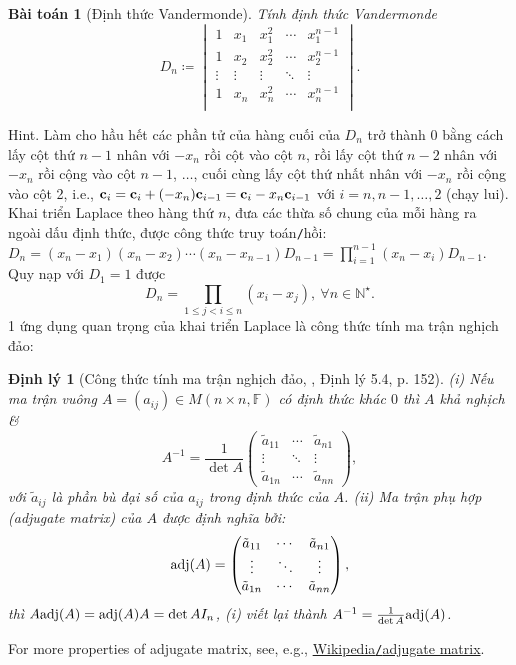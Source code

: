 \documentclass{article}
\newtheorem{baitoan}{Bài toán}
\newtheorem{dinhly}{Định lý}
\begin{document}
\begin{baitoan}[Định thức Vandermonde]
	Tính định thức Vandermonde
	\begin{equation*}
		D_n\coloneqq\begin{vmatrix}
			1 & x_1 & x_1^2 & \cdots & x_1^{n-1}\\
			1 & x_2 & x_2^2 & \cdots & x_2^{n-1}\\
			\vdots & \vdots & \vdots & \ddots & \vdots\\
			1 & x_n & x_n^2 & \cdots & x_n^{n-1}\\
		\end{vmatrix}.
	\end{equation*}
\end{baitoan}
{\sf Hint.} Làm cho hầu hết các phần tử của hàng cuối của $D_n$ trở thành 0 bằng cách lấy cột thứ $n - 1$ nhân với $-x_n$ rồi cột vào cột $n$, rồi lấy cột thứ $n - 2$ nhân với $-x_n$ rồi cộng vào cột $n - 1$, $\ldots$, cuối cùng lấy cột thứ nhất nhân với $-x_n$ rồi cộng vào cột 2, i.e., ${\bf c}_i = {\bf c}_i + (-x_n){\bf c}_{i-1} = {\bf c}_i - x_n{\bf c}_{i-1}$ với $i = n,n - 1,\ldots,2$ (chạy lui). Khai triển Laplace theo hàng thứ $n$, đưa các thừa số chung của mỗi hàng ra ngoài dấu định thức, được công thức truy toán{\tt/}hồi: $D_n = (x_n - x_1)(x_n - x_2)\cdots(x_n - x_{n-1})D_{n-1} = \prod_{i=1}^{n-1} (x_n - x_i)D_{n-1}$. Quy nạp với $D_1 = 1$ được
\begin{equation}
	\label{Vandermonde det}
	\tag{Vandermonde}
	D_n = \prod_{1\le j < i\le n} (x_i - x_j),\ \forall n\in\mathbb{N}^\star.
\end{equation}
1 ứng dụng quan trọng của khai triển Laplace là công thức tính ma trận nghịch đảo:

\begin{dinhly}[Công thức tính ma trận nghịch đảo, \cite{Hung_linear_algebra}, Định lý 5.4, p. 152]
	(i) Nếu ma trận vuông $A = (a_{ij})\in M(n\times n,\mathbb{F})$ có định thức khác $0$ thì $A$ khả nghịch \&
	\begin{equation*}
		A^{-1} = \frac{1}{\det A}\begin{pmatrix}
			\tilde{a}_{11} & \cdots & \tilde{a}_{n1}\\\vdots & \ddots & \vdots\\\tilde{a}_{1n} & \cdots & \tilde{a}_{nn}
		\end{pmatrix},
	\end{equation*}
	với $\tilde{a}_{ij}$ là phần bù đại số của $a_{ij}$ trong định thức của $A$. (ii) {\rm Ma trận phụ hợp} (adjugate matrix) của $A$ được định nghĩa bởi:
	\begin{equation*}
		{\rm adj}(A) = \begin{pmatrix}
			\tilde{a}_{11} & \cdots & \tilde{a}_{n1}\\\vdots & \ddots & \vdots\\\tilde{a}_{1n} & \cdots & \tilde{a}_{nn}
		\end{pmatrix},
	\end{equation*}
	thì $A{\rm adj}(A) = {\rm adj}(A)A = \det A I_n$, (i) viết lại thành $A^{-1} = \frac{1}{\det A}{\rm adj}(A)$.
\end{dinhly}
For more properties of adjugate matrix, see, e.g., \href{https://en.wikipedia.org/wiki/Adjugate_matrix}{Wikipedia{\tt/}adjugate matrix}.
\end{document}
